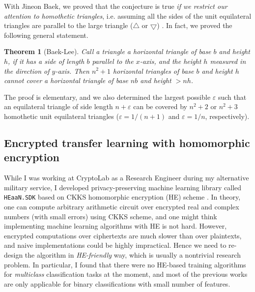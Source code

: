 \documentclass[12pt]{article}
\newtheorem*{theorem*}{Theorem}
\begin{document}
With Jineon Baek, we proved that the conjecture is true \emph{if we restrict our attention to homothetic triangles}, i.e. assuming all the sides of the unit equilateral triangles are parallel to the large triangle ($\bigtriangleup$ or $\bigtriangledown$) \cite{baek2024n2}.
In fact, we proved the following general statement.

\begin{theorem*}[Baek-Lee]
Call a triangle a horizontal triangle of base $b$ and height $h$, if it has a side of length $b$ parallel to the $x$-axis, and the height $h$ measured in the direction of $y$-axis.
Then $n^2 + 1$ horizontal triangles of base $b$ and height $h$ cannot cover a horizontal triangle of base $nb$ and height $> nh$.
\end{theorem*}

The proof is elementary, and we also determined the largest possible $\varepsilon$ such that an equilateral triangle of side length $n + \varepsilon$ can be covered by $n^2 + 2$ or $n^2 + 3$ homothetic unit equilateral triangles ($\varepsilon = 1/(n+1)$ and $\varepsilon = 1 / n$, respectively). 

\subsection*{Encrypted transfer learning with homomorphic encryption}

While I was working at CryptoLab as a Research Engineer during my alternative military service, I developed privacy-preserving machine learning library called \texttt{HEaaN.SDK} \cite{heaansdk} based on CKKS homomorphic encryption (HE) scheme \cite{cheon2017homomorphic}.
In theory, one can compute arbitrary arithmetic circuit over encrypted real and complex numbers (with small errors) using CKKS scheme, and one might think implementing machine learning algorithms with HE is not hard.
However, encrypted computations over ciphertexts are much slower than over plaintexts, and naive implementations could be highly impractical.
Hence we need to re-design the algorithm in \emph{HE-friendly} way, which is usually a nontrivial research problem.
In particular, I found that there were no HE-based training algorithms for \emph{multiclass} classification tasks at the moment, and most of the previous works are only applicable for binary classifications with small number of features.
\end{document}
